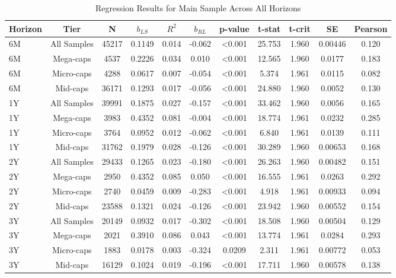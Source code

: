 \documentclass[11pt]{article}
\begin{document}
\begin{table*}[h]
\centering
\caption{Regression Results for Main Sample Across All Horizons}
\label{tab:regression-all}
\small
\begin{tabular}{lcccccccccc}
\toprule
Horizon & Tier & N & $b_{LS}$ & $R^2$ & $b_{RL}$ & p-value & t-stat & t-crit & SE & Pearson \\
\midrule
6M  & All Samples & 45217 & 0.1149 & 0.014 & -0.062 & <0.001 & 25.753 & 1.960 & 0.00446 & 0.120 \\
6M  & Mega-caps   & 4537  & 0.2226 & 0.034 &  0.010 & <0.001  & 12.565 & 1.960 & 0.0177  & 0.183 \\
6M  & Micro-caps  & 4288  & 0.0617 & 0.007 & -0.054 & <0.001    &  5.374 & 1.961 & 0.0115  & 0.082 \\
6M  & Mid-caps    & 36171 & 0.1293 & 0.017 & -0.056 & <0.001 & 24.880 & 1.960 & 0.0052  & 0.130 \\
\midrule
1Y  & All Samples & 39991 & 0.1875 & 0.027 & -0.157 & <0.001 & 33.462 & 1.960 & 0.0056  & 0.165 \\
1Y  & Mega-caps   & 3983  & 0.4352 & 0.081 & -0.004 & <0.001  & 18.774 & 1.961 & 0.0232  & 0.285 \\
1Y  & Micro-caps  & 3764  & 0.0952 & 0.012 & -0.062 & <0.001  &  6.840 & 1.961 & 0.0139  & 0.111 \\
1Y  & Mid-caps    & 31762 & 0.1979 & 0.028 & -0.126 & <0.001 & 30.289 & 1.960 & 0.00653 & 0.168 \\
\midrule
2Y  & All Samples & 29433 & 0.1265 & 0.023 & -0.180 & <0.001 & 26.263 & 1.960 & 0.00482 & 0.151 \\
2Y  & Mega-caps   & 2950  & 0.4352 & 0.085 &  0.050 & <0.001  & 16.555 & 1.961 & 0.0263  & 0.292 \\
2Y  & Micro-caps  & 2740  & 0.0459 & 0.009 & -0.283 & <0.001   &  4.918 & 1.961 & 0.00933 & 0.094 \\
2Y  & Mid-caps    & 23588 & 0.1321 & 0.024 & -0.126 & <0.001 & 23.942 & 1.960 & 0.00552 & 0.154 \\
\midrule
3Y  & All Samples & 20149 & 0.0932 & 0.017 & -0.302 & <0.001  & 18.508 & 1.960 & 0.00504 & 0.129 \\
3Y  & Mega-caps   & 2021  & 0.3910 & 0.086 &  0.043 & <0.001  & 13.774 & 1.961 & 0.0284  & 0.293 \\
3Y  & Micro-caps  & 1883  & 0.0178 & 0.003 & -0.324 & 0.0209                  &  2.311 & 1.961 & 0.00772 & 0.053 \\
3Y  & Mid-caps    & 16129 & 0.1024 & 0.019 & -0.196 & <0.001  & 17.711 & 1.960 & 0.00578 & 0.138 \\
\bottomrule
\end{tabular}
\end{table*}
\end{document}
